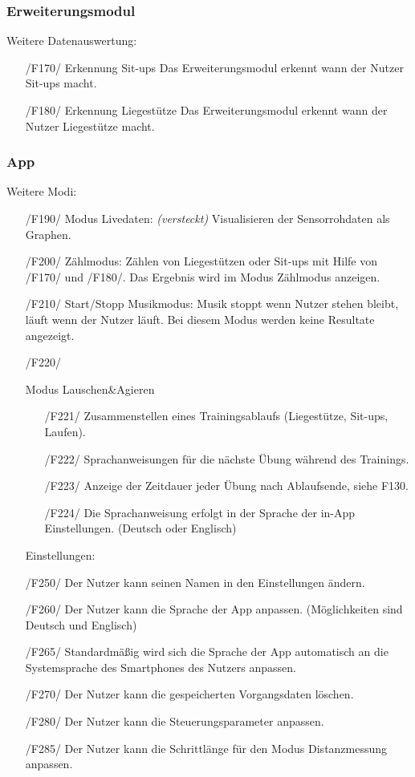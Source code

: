 \documentclass[a4paper,12pt]{article}
\begin{document}
    \subsubsection{Erweiterungsmodul}
      Weitere Datenauswertung:
      \begin{itemize}
      \item[/F170/] \textsf{Erkennung Sit-ups} Das Erweiterungsmodul erkennt wann der Nutzer Sit-ups macht.
      \item[/F180/] \textsf{Erkennung Liegestütze} Das Erweiterungsmodul erkennt wann der Nutzer Liegestütze macht.
      \end{itemize} 
    \subsubsection{App}
      Weitere Modi:
      \begin{itemize}
      \item[/F190/] \textsf{Modus Livedaten: \textit{(versteckt)}} Visualisieren der Sensorrohdaten als Graphen.
      \item[/F200/] \textsf{Zählmodus:} Zählen von Liegestützen oder Sit-ups mit Hilfe von /F170/ und /F180/. Das Ergebnis wird im Modus \glqq{} Zählmodus \grqq{} anzeigen.
      \item[/F210/] \textsf{Start/Stopp Musikmodus:} Musik stoppt wenn Nutzer stehen bleibt, läuft wenn der Nutzer läuft. Bei diesem Modus werden keine Resultate angezeigt.
      \item[/F220/]{
        Modus \glqq Lauschen\&Agieren\grqq
        \begin{itemize}
          \item[/F221/] Zusammenstellen eines Trainingsablaufs (Liegestütze, Sit-ups, Laufen). 
          \item[/F222/] Sprachanweisungen für die nächste Übung während des Trainings. 
          \item[/F223/] Anzeige der Zeitdauer jeder Übung nach Ablaufsende, siehe F130.
          \item[/F224/] Die Sprachanweisung erfolgt in der Sprache der in-App Einstellungen. (Deutsch oder Englisch)
        \end{itemize}
      }

      Einstellungen:
      \item[/F250/] Der Nutzer kann seinen Namen in den Einstellungen ändern.
      \item[/F260/] Der Nutzer kann die Sprache der App anpassen. (Möglichkeiten sind Deutsch und Englisch)
      \item[/F265/] Standardmäßig wird sich die Sprache der App automatisch an die Systemsprache des Smartphones des Nutzers anpassen.
      \item[/F270/] Der Nutzer kann die gespeicherten \Gls{Vorgangsdaten} löschen.
      \item[/F280/] Der Nutzer kann die \Gls{Steuerungsparameter} anpassen. 
      \item[/F285/] Der Nutzer kann die Schrittlänge für den Modus Distanzmessung anpassen.
      

\end{itemize}
\end{document}
